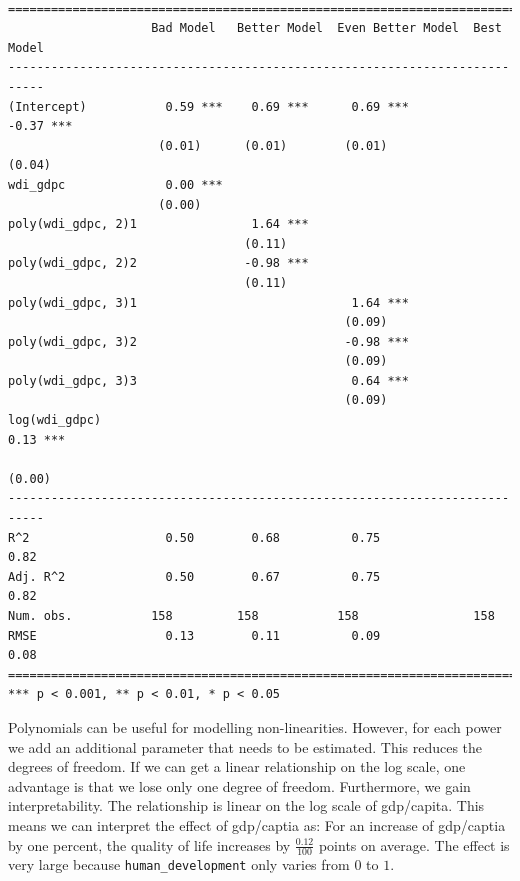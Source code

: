 \documentclass[]{article}
\theoremstyle{definition}
\theoremstyle{definition}
\theoremstyle{definition}
\theoremstyle{remark}
\begin{document}
\begin{verbatim}

===========================================================================
                    Bad Model   Better Model  Even Better Model  Best Model
---------------------------------------------------------------------------
(Intercept)           0.59 ***    0.69 ***      0.69 ***          -0.37 ***
                     (0.01)      (0.01)        (0.01)             (0.04)   
wdi_gdpc              0.00 ***                                             
                     (0.00)                                                
poly(wdi_gdpc, 2)1                1.64 ***                                 
                                 (0.11)                                    
poly(wdi_gdpc, 2)2               -0.98 ***                                 
                                 (0.11)                                    
poly(wdi_gdpc, 3)1                              1.64 ***                   
                                               (0.09)                      
poly(wdi_gdpc, 3)2                             -0.98 ***                   
                                               (0.09)                      
poly(wdi_gdpc, 3)3                              0.64 ***                   
                                               (0.09)                      
log(wdi_gdpc)                                                      0.13 ***
                                                                  (0.00)   
---------------------------------------------------------------------------
R^2                   0.50        0.68          0.75               0.82    
Adj. R^2              0.50        0.67          0.75               0.82    
Num. obs.           158         158           158                158       
RMSE                  0.13        0.11          0.09               0.08    
===========================================================================
*** p < 0.001, ** p < 0.01, * p < 0.05
\end{verbatim}

Polynomials can be useful for modelling non-linearities. However, for
each power we add an additional parameter that needs to be estimated.
This reduces the degrees of freedom. If we can get a linear relationship
on the log scale, one advantage is that we lose only one degree of
freedom. Furthermore, we gain interpretability. The relationship is
linear on the log scale of gdp/capita. This means we can interpret the
effect of gdp/captia as: For an increase of gdp/captia by one percent,
the quality of life increases by \(\frac{0.12}{100}\) points on average.
The effect is very large because \texttt{human\_development} only varies
from \(0\) to \(1\).
\end{document}
